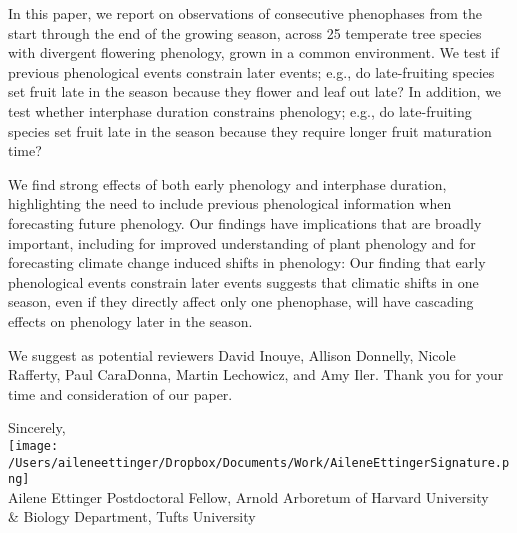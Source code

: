 \documentclass[10.95pt,a4paper]{letter}
\begin{document}
\begin{letter}{}
In this paper, we report on observations of consecutive phenophases from the start through the end of the growing season, across 25 temperate tree species with divergent flowering phenology, grown in a common environment. We test if previous phenological events constrain later events; e.g., do late-fruiting species set fruit late in the season because they flower and leaf out late? In addition, we test whether interphase duration constrains phenology; e.g., do late-fruiting species set fruit late in the season because they require longer fruit maturation time? 

We find strong effects of both early phenology and interphase duration, highlighting the need to include previous phenological information when forecasting future phenology. Our findings have implications that are broadly important, including  for improved understanding of plant phenology and for forecasting climate change induced shifts in phenology: Our finding that early phenological events constrain later events suggests that climatic shifts in one season, even if they directly affect only one phenophase, will have cascading effects on phenology later in the season. 

We suggest as potential reviewers David Inouye, Allison Donnelly, Nicole Rafferty, Paul CaraDonna, Martin Lechowicz, and Amy Iler. Thank you for your time and consideration of our paper. 


Sincerely,\\

\texttt{[image: /Users/aileneettinger/Dropbox/Documents/Work/AileneEttingerSignature.png]} \\
Ailene Ettinger
Postdoctoral Fellow, Arnold Arboretum of Harvard University \\ \& Biology Department, Tufts University


\clearpage



\end{letter}
\end{document}
